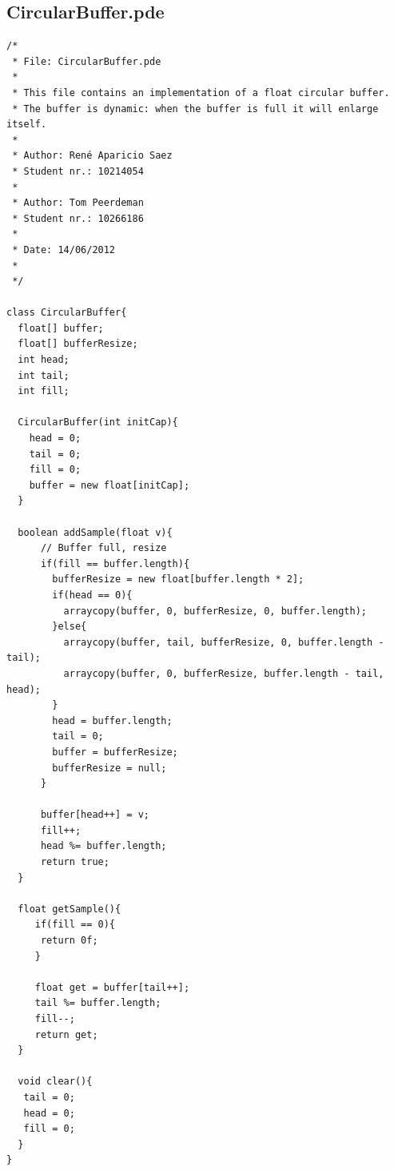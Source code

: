 \documentclass[a4paper]{article}
\begin{document}
\subsection{CircularBuffer.pde}
\begin{verbatim}
/*
 * File: CircularBuffer.pde
 *
 * This file contains an implementation of a float circular buffer.
 * The buffer is dynamic: when the buffer is full it will enlarge itself.
 *
 * Author: René Aparicio Saez
 * Student nr.: 10214054
 *
 * Author: Tom Peerdeman
 * Student nr.: 10266186
 *
 * Date: 14/06/2012
 *
 */

class CircularBuffer{
  float[] buffer;
  float[] bufferResize;
  int head;
  int tail;
  int fill;
  
  CircularBuffer(int initCap){
    head = 0;
    tail = 0;
    fill = 0;
    buffer = new float[initCap];
  }
  
  boolean addSample(float v){
      // Buffer full, resize
      if(fill == buffer.length){
        bufferResize = new float[buffer.length * 2];
        if(head == 0){
          arraycopy(buffer, 0, bufferResize, 0, buffer.length);       
        }else{
          arraycopy(buffer, tail, bufferResize, 0, buffer.length - tail);
          arraycopy(buffer, 0, bufferResize, buffer.length - tail, head);
        }
        head = buffer.length;
        tail = 0;
        buffer = bufferResize;
        bufferResize = null;
      }
      
      buffer[head++] = v;
      fill++;
      head %= buffer.length;
      return true;
  }
  
  float getSample(){
     if(fill == 0){
      return 0f;
     } 
     
     float get = buffer[tail++];
     tail %= buffer.length;
     fill--;
     return get;
  }
  
  void clear(){
   tail = 0;
   head = 0; 
   fill = 0;
  }
}
\end{verbatim}
\newpage
\end{document}
